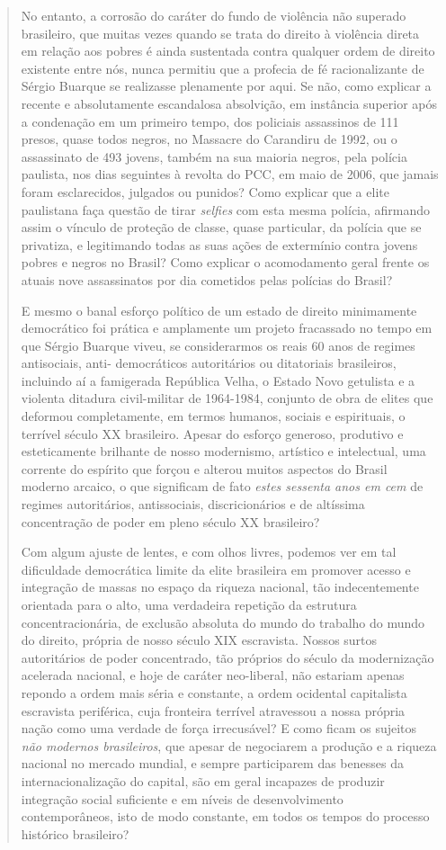 \begin{quote}
No entanto, a corrosão do caráter do fundo de violência não superado
brasileiro, que muitas vezes quando se trata do direito à violência
direta em relação aos pobres é ainda sustentada contra qualquer ordem de
direito existente entre nós, nunca permitiu que a profecia de fé
racionalizante de Sérgio Buarque se realizasse plenamente por aqui. Se
não, como explicar a recente e absolutamente escandalosa absolvição, em
instância superior após a condenação em um primeiro tempo, dos policiais
assassinos de 111 presos, quase todos negros, no Massacre do Carandiru
de 1992, ou o assassinato de 493 jovens, também na sua maioria negros,
pela polícia paulista, nos dias seguintes à revolta do PCC, em maio de
2006, que jamais foram esclarecidos, julgados ou punidos? Como explicar
que a elite paulistana faça questão de tirar \emph{selfies} com esta
mesma polícia, afirmando assim o vínculo de proteção de classe, quase
particular, da polícia que se privatiza, e legitimando todas as suas
ações de extermínio contra jovens pobres e negros no Brasil? Como
explicar o acomodamento geral frente os atuais nove assassinatos por dia
cometidos pelas polícias do Brasil?

E mesmo o banal esforço político de um estado de direito minimamente
democrático foi prática e amplamente um projeto fracassado no tempo em
que Sérgio Buarque viveu, se considerarmos os reais 60 anos de regimes
antisociais, anti- democráticos autoritários ou ditatoriais brasileiros,
incluindo aí a famigerada República Velha, o Estado Novo getulista e a
violenta ditadura civil-militar de 1964-1984, conjunto de obra de elites
que deformou completamente, em termos humanos, sociais e espirituais, o
terrível século XX brasileiro. Apesar do esforço generoso, produtivo e
esteticamente brilhante de nosso modernismo, artístico e intelectual,
uma corrente do espírito que forçou e alterou muitos aspectos do Brasil
moderno arcaico, o que significam de fato \emph{estes sessenta anos em
cem} de regimes autoritários, antissociais, discricionários e de
altíssima concentração de poder em pleno século XX brasileiro?

Com algum ajuste de lentes, e com olhos livres, podemos ver em tal
dificuldade democrática limite da elite brasileira em promover acesso e
integração de massas no espaço da riqueza nacional, tão indecentemente
orientada para o alto, uma verdadeira repetição da estrutura
concentracionária, de exclusão absoluta do mundo do trabalho do mundo do
direito, própria de nosso século XIX escravista. Nossos surtos
autoritários de poder concentrado, tão próprios do século da
modernização acelerada nacional, e hoje de caráter neo-liberal, não
estariam apenas repondo a ordem mais séria e constante, a ordem
ocidental capitalista escravista periférica, cuja fronteira terrível
atravessou a nossa própria nação como uma verdade de força irrecusável?
E como ficam os sujeitos \emph{não modernos brasileiros}, que apesar de
negociarem a produção e a riqueza nacional no mercado mundial, e sempre
participarem das benesses da internacionalização do capital, são em
geral incapazes de produzir integração social suficiente e em níveis de
desenvolvimento contemporâneos, isto de modo constante, em todos os
tempos do processo histórico brasileiro?


\end{quote}

